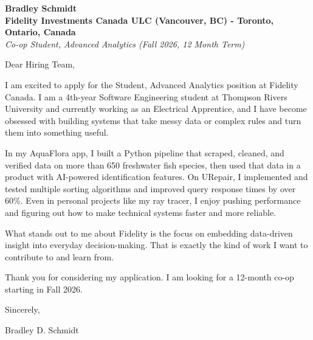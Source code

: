 \documentclass[11pt]{article}
\begin{document}
\textbf{Bradley Schmidt}\\
\vspace{0.5em}
\textbf{Fidelity Investments Canada ULC (Vancouver, BC) - Toronto, Ontario, Canada}\\
\textit{Co-op Student, Advanced Analytics (Fall 2026, 12 Month Term)}

Dear Hiring Team,

\par

I am excited to apply for the Student, Advanced Analytics position at Fidelity Canada. I am a 4th-year Software Engineering student at Thompson Rivers University and currently working as an Electrical Apprentice, and I have become obsessed with building systems that take messy data or complex rules and turn them into something useful.

\par

In my AquaFlora app, I built a Python pipeline that scraped, cleaned, and verified data on more than 650 freshwater fish species, then used that data in a product with AI-powered identification features. On URepair, I implemented and tested multiple sorting algorithms and improved query response times by over 60\%. Even in personal projects like my ray tracer, I enjoy pushing performance and figuring out how to make technical systems faster and more reliable.

\par

What stands out to me about Fidelity is the focus on embedding data-driven insight into everyday decision-making. That is exactly the kind of work I want to contribute to and learn from.

\par

Thank you for considering my application. I am looking for a 12-month co-op starting in Fall 2026.

\par

Sincerely,

\par

Bradley D. Schmidt
\end{document}

